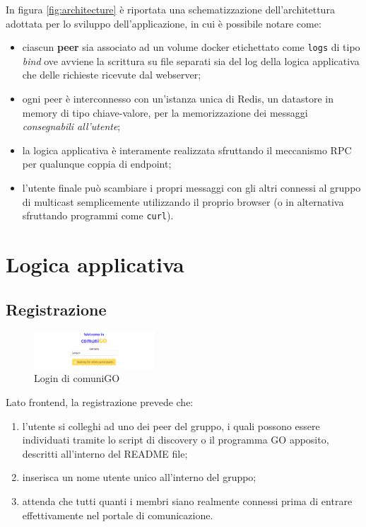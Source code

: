 \documentclass[conference]{IEEEtran}
\begin{document}
In figura \ref{fig:architecture} è riportata una schematizzazione dell'architettura adottata per lo sviluppo dell'applicazione, in cui è possibile notare come:
\begin{itemize}
\item ciascun \textbf{peer} sia associato ad un volume docker etichettato come \texttt{logs} di tipo \textit{bind} ove avviene la scrittura su file separati sia del log della logica applicativa che delle richieste ricevute dal webserver;

\item ogni peer è interconnesso con un'istanza unica di Redis, un datastore in memory di tipo chiave-valore, per la memorizzazione dei messaggi \textit{consegnabili all'utente};

\item la logica applicativa è interamente realizzata sfruttando il meccanismo RPC per qualunque coppia di endpoint;

\item l'utente finale può scambiare i propri messaggi con gli altri connessi al gruppo di multicast semplicemente utilizzando il proprio browser (o in alternativa sfruttando programmi come \texttt{curl}). 
\end{itemize}
\newpage
\section{Logica applicativa}
\subsection{Registrazione}
\begin{figure}[htbp]
\centerline{\includegraphics[width=0.4\textwidth]{figs/login.png}}
\caption{Login di comuniGO}
\label{fig:login}
\end{figure}
Lato frontend, la registrazione prevede che:
\begin{enumerate}
\item l'utente si colleghi ad uno dei peer del gruppo, i quali possono essere individuati tramite lo script di discovery o il programma GO apposito, descritti all'interno del README file;
\item inserisca un nome utente unico all'interno del gruppo;
\item attenda che tutti quanti i membri siano realmente connessi prima di entrare effettivamente nel portale di comunicazione.
\end{enumerate}
\end{document}
